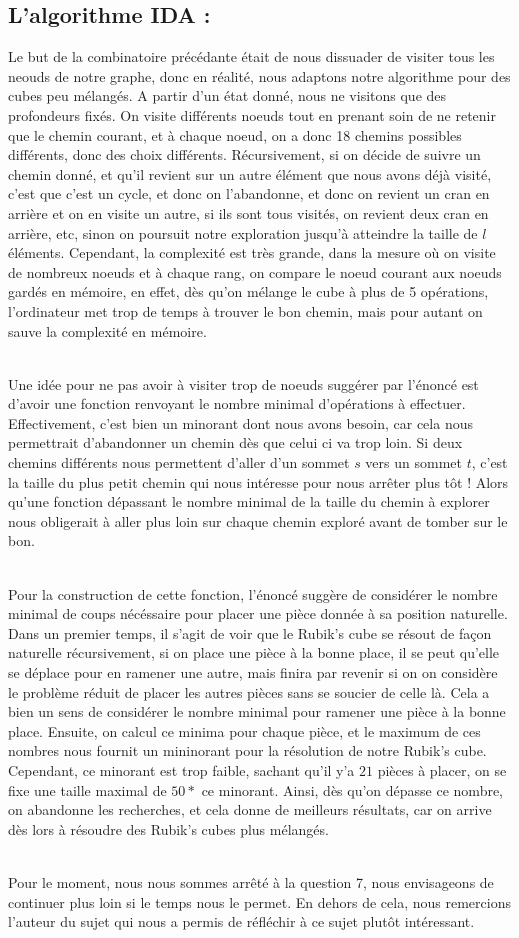\documentclass[a4paper,11pt]{article}
\theoremstyle{mytheor}
\begin{document}
\subsection{L'algorithme IDA : }
Le but de la combinatoire précédante était de nous dissuader de visiter tous les neouds de notre graphe, donc en réalité, nous adaptons notre algorithme pour des cubes peu mélangés. A partir d'un état donné, nous ne visitons que des profondeurs fixés. On visite différents noeuds tout en prenant soin de ne retenir que le chemin courant, et à chaque noeud, on a donc 18 chemins possibles différents, donc des choix différents. Récursivement, si on décide de suivre un chemin donné, et qu'il revient sur un autre élément que nous avons déjà visité, c'est que c'est un cycle, et donc on l'abandonne, et donc on revient un cran en arrière et on en visite un autre, si ils sont tous visités, on revient deux cran en arrière, etc, sinon on poursuit notre exploration jusqu'à atteindre la taille de $l$ éléments. Cependant, la complexité est très grande, dans la mesure où on visite de nombreux noeuds et à chaque rang, on compare le noeud courant aux noeuds gardés en mémoire, en effet, dès qu'on mélange le cube à plus de 5 opérations, l'ordinateur met trop de temps à trouver le bon chemin, mais pour autant on sauve la complexité en mémoire.

\\
Une idée pour ne pas avoir à visiter trop de noeuds suggérer par l'énoncé est d'avoir une fonction renvoyant le nombre minimal d'opérations à effectuer. Effectivement, c'est bien un minorant dont nous avons besoin, car cela nous permettrait d'abandonner un chemin dès que celui ci va trop loin. Si deux chemins différents nous permettent d'aller d'un sommet $s$ vers un sommet $t$, c'est la taille du plus petit chemin qui nous intéresse pour nous arrêter plus tôt ! Alors qu'une fonction dépassant le nombre minimal de la taille du chemin à explorer nous obligerait à aller plus loin sur chaque chemin exploré avant de tomber sur le bon.

\\
Pour la construction de cette fonction, l'énoncé suggère de considérer le nombre minimal de coups  nécéssaire pour placer une pièce donnée à sa position naturelle. Dans un premier temps, il s'agit de voir que le Rubik's cube se résout de façon naturelle récursivement, si on place une pièce à la bonne place, il se peut qu'elle se déplace pour en ramener une autre, mais finira par revenir si on on considère le problème réduit de placer les autres pièces sans se soucier de celle là. Cela a bien un sens de considérer le nombre minimal pour ramener une pièce à la bonne place. Ensuite, on calcul ce minima pour chaque pièce, et le maximum de ces nombres nous fournit un mininorant pour la résolution de notre Rubik's cube. Cependant, ce minorant est trop faible, sachant qu'il y'a $21$ pièces à placer, on se fixe une taille maximal de $50 *$ ce minorant. Ainsi, dès qu'on dépasse ce nombre, on abandonne les recherches, et cela donne de meilleurs résultats, car on arrive dès lors à résoudre des Rubik's cubes plus mélangés.

\\
Pour le moment, nous nous sommes arrêté à la question 7, nous envisageons de continuer plus loin si le temps nous le permet. En dehors de cela, nous remercions l'auteur du sujet qui nous a permis de réfléchir à ce sujet plutôt intéressant.
\end{document}
